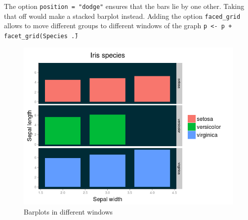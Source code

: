 The option \texttt{position = "dodge"}
ensures that the bars lie by one other. Taking 
that off would make a stacked barplot instead.
Adding the option \texttt{faced\_grid} allows to move 
different groups to different windows of the graph
\texttt{p <- p + facet\_grid(Species \~ .)}
\begin{figure}[htbp]
 \centering
 \includegraphics[scale=0.6]{images/facet_grid}
 \caption*{Barplots in different windows}
\end{figure}

